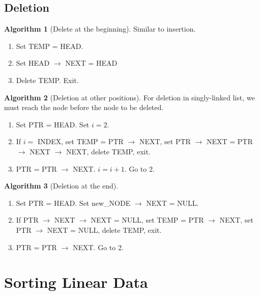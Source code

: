 \documentclass[10pt, a4paper]{extarticle}
\theoremstyle{definition}
\newtheorem{alg}{Algorithm}
\begin{document}
\subsection{Deletion}
\begin{alg}[Delete at the beginning]
	Similar to insertion.
	\begin{enumerate}
		\item Set TEMP = HEAD.
		\item Set HEAD $\to$ NEXT = HEAD
		\item Delete TEMP. Exit.
	\end{enumerate}
\end{alg}
\begin{alg}[Deletion at other positions]
	For deletion in singly-linked list, we must reach the node before the node to be deleted.
	\begin{enumerate}
		\item Set PTR = HEAD. Set $i=2$.
		\item If $i=$ INDEX, set TEMP = PTR $\to$ NEXT, set PTR $\to$ NEXT = PTR $\to$ NEXT $\to$ NEXT, delete TEMP, exit.
		\item PTR = PTR $\to$ NEXT. $i=i+1$. Go to 2.
	\end{enumerate}
\end{alg}
\begin{alg}[Deletion at the end]
	\hfill
	\begin{enumerate}
		\item Set PTR = HEAD. Set new\_NODE $\to$ NEXT = NULL.
		\item If PTR $\to$ NEXT $\to$ NEXT = NULL, set TEMP = PTR $\to$ NEXT, set PTR $\to$ NEXT = NULL, delete TEMP, exit.
		\item PTR = PTR $\to$ NEXT. Go to 2.
	\end{enumerate}
\end{alg}

\section{Sorting Linear Data}
\end{document}
